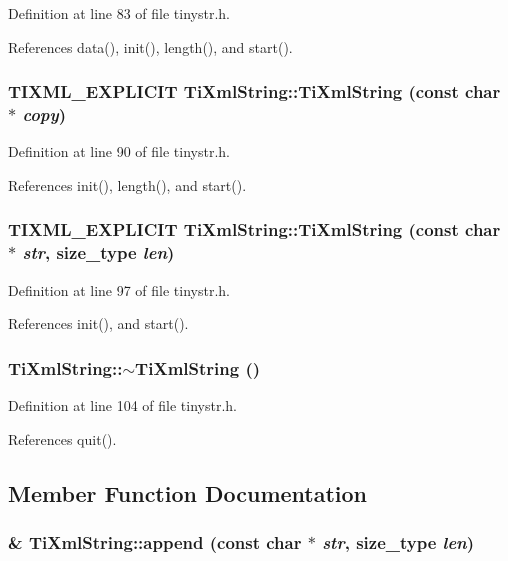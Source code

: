 Definition at line 83 of file tinystr.h.

References data(), init(), length(), and start().\hypertarget{class_ti_xml_string_aa3b32bd2891a757c9f36c21db44c81d2}{
\subsubsection[{TiXmlString}]{\setlength{\rightskip}{0pt plus 5cm}TIXML\_\-EXPLICIT TiXmlString::TiXmlString (const char $\ast$ {\em copy})}}
\label{class_ti_xml_string_aa3b32bd2891a757c9f36c21db44c81d2}


Definition at line 90 of file tinystr.h.

References init(), length(), and start().\hypertarget{class_ti_xml_string_a4b17ea5c5db986f14827223dfa8f1547}{
\subsubsection[{TiXmlString}]{\setlength{\rightskip}{0pt plus 5cm}TIXML\_\-EXPLICIT TiXmlString::TiXmlString (const char $\ast$ {\em str}, \/  {\bf size\_\-type} {\em len})}}
\label{class_ti_xml_string_a4b17ea5c5db986f14827223dfa8f1547}


Definition at line 97 of file tinystr.h.

References init(), and start().\hypertarget{class_ti_xml_string_a7ac03f581ca3422c4808162ab14f3450}{
\subsubsection[{$\sim$TiXmlString}]{\setlength{\rightskip}{0pt plus 5cm}TiXmlString::$\sim$TiXmlString ()}}
\label{class_ti_xml_string_a7ac03f581ca3422c4808162ab14f3450}


Definition at line 104 of file tinystr.h.

References quit().

\subsection{Member Function Documentation}
\hypertarget{class_ti_xml_string_a717b00190c8acdee94816d2f4f20e75a}{
\subsubsection[{append}]{\& TiXmlString::append (const char $\ast$ {\em str}, \/  {\bf size\_\-type} {\em len})}}
\label{class_ti_xml_string_a717b00190c8acdee94816d2f4f20e75a}


